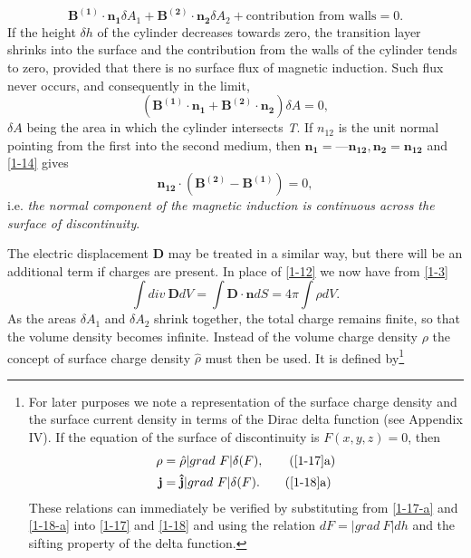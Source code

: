 \documentclass[lang=en,11pt]{elegantbook}
\begin{document}
	\begin{equation}
	\mathbf{B^{(1)}\cdot n_{1}}\delta A_{1}+\mathbf{B^{(2)}\cdot n_{2}}\delta A_{2}+\text{contribution from walls}=0.
	\label{1-13}
	\end{equation}
	If the height $\delta h$ of the cylinder decreases towards zero, the transition layer shrinks into the surface and the contribution from the walls of the cylinder tends to zero, provided that there is no surface flux of magnetic induction. Such flux never occurs, and consequently in the limit,
	\begin{equation}
	(\mathbf{B^{(1)}\cdot n_{1}}+\mathbf{B^{(2)}\cdot n_{2}})\delta A=0,
	\label{1-14}
	\end{equation}
	$\delta A$ being the area in which the cylinder intersects \textit{T}. If $n_{12}$ is the unit normal pointing from the first into the second medium, then $\mathbf{n_{1}} = —\mathbf{n_{12}}, \mathbf{n_2} = \mathbf{n_{12}}$ and \eqref{1-14} gives
	\begin{equation}
	\mathbf{n_{12}}\cdot(\mathbf{B^{(2)}-\mathbf{B^{(1)}}})=0,
	\label{1-15}
	\end{equation}
	i.e. \textit{the normal component of the magnetic induction is continuous across the surface of discontinuity}.\par 
	The electric displacement \textbf{D} may be treated in a similar way, but there will be an additional term if charges are present. In place of \eqref{1-12} we now have from \eqref{1-3}
	\begin{equation}
	\int div\ \mathbf{D}dV=\int\mathbf{D\cdot n}dS=4\pi\int\rho dV.
	\label{1-16}
	\end{equation}
	As the areas $\delta A_1$ and $\delta A_2$ shrink together, the total charge remains finite, so that the volume density becomes infinite. Instead of the volume charge density $\rho$ the concept of surface charge density $\hat{\rho}$ must then be used. It is defined by\footnote{For later purposes we note a representation of the surface charge density and the surface current density in terms of the Dirac delta function (see Appendix IV). If the equation of the surface of discontinuity is $F(x, y, z)=0$, then
			\begin{align}
			\rho &= \hat{\rho}|grad\ F|\delta(F),\tag{\ref{1-17}{a}} \label{1-17-a}\\
			\mathbf{j} &= \mathbf{\hat{j}}|grad\ F|\delta(F).\tag{\ref{1-18}{a}} \label{1-18-a}
			\end{align}
 		These relations can immediately be verified by substituting from \eqref{1-17-a} and \eqref{1-18-a} into \eqref{1-17} and \eqref{1-18} and using the relation $dF=|grad\ F|dh$ and the sifting property of the delta function.}
\end{document}
